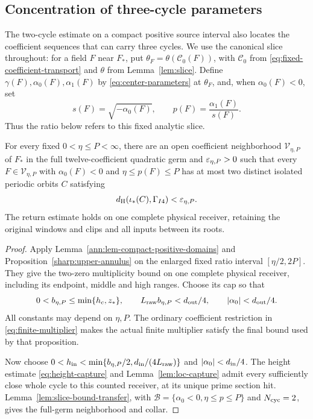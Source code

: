 \subsection{Concentration of three-cycle parameters}
\label{sec:three-cycle-concentration}

The two-cycle estimate on a compact positive source interval also
locates the coefficient sequences that can carry three cycles. We use
the canonical slice throughout: for a field \(F\) near \(F_*\), put
\(\theta_F=\theta(\mathscr C_0(F))\), with
\(\mathscr C_0\) from \eqref{eq:fixed-coefficient-transport} and
\(\theta\) from Lemma~\ref{lem:slice}. Define
\(\gamma(F),\alpha_0(F),\alpha_1(F)\) by
\eqref{eq:center-parameters} at \(\theta_F\), and, when
\(\alpha_0(F)<0\), set
\[
 s(F)=\sqrt{-\alpha_0(F)},\qquad
 p(F)=\frac{\alpha_1(F)}{s(F)}.
\]
Thus the ratio below refers to this fixed analytic slice.

\begin{proposition}
\label{prop:compact-positive-two-cycle-exclusion}
For every fixed \(0<\eta\le P<\infty\), there are an open
coefficient neighborhood \(\mathcal V_{\eta,P}\) of \(F_*\) in
the full twelve-coefficient quadratic germ and
\(\varepsilon_{\eta,P}>0\) such that every
\(F\in\mathcal V_{\eta,P}\) with
\(\alpha_0(F)<0\) and \(\eta\le p(F)\le P\) has at most
two distinct isolated periodic orbits \(C\) satisfying
\[
 d_{\rm H}(\iota_*(C),\Gamma_{I4})<\varepsilon_{\eta,P}.
\]
The return estimate holds on one complete physical receiver, retaining
the original windows and clips and all inputs between its roots.
\end{proposition}

\begin{proof}
Apply Lemma~\ref{ann:lem-compact-positive-domains} and
Proposition~\ref{sharp:upper-annulus} on the enlarged fixed ratio
interval \([\eta/2,2P]\). They give the two-zero multiplicity bound
on one complete physical receiver, including its endpoint, middle and
high ranges. Choose its cap so that
\[
 0<b_{\eta,P}\le\min\{h_c,z_*\},\qquad
 L_{\rm raw}b_{\eta,P}<d_{\rm out}/4,
 \qquad |\alpha_0|<d_{\rm out}/4.
\]
All constants may depend on \(\eta,P\). The ordinary coefficient
restriction in \eqref{eq:finite-multiplier} makes the actual finite
multiplier satisfy the final bound used by that proposition.

Now choose
\(0<h_{\rm in}<\min\{b_{\eta,P}/2,d_{\rm in}/(4L_{\rm raw})\}\)
and \(|\alpha_0|<d_{\rm in}/4\). The height estimate
\eqref{eq:height-capture} and Lemma~\ref{lem:loc-capture} admit every
sufficiently close whole cycle to this counted receiver, at its unique
prime section hit. Lemma~\ref{lem:slice-bound-transfer}, with
\(\mathcal B=\{\alpha_0<0,\eta\le p\le P\}\) and
\(N_{\rm cyc}=2\), gives the full-germ neighborhood and collar.
\end{proof}

